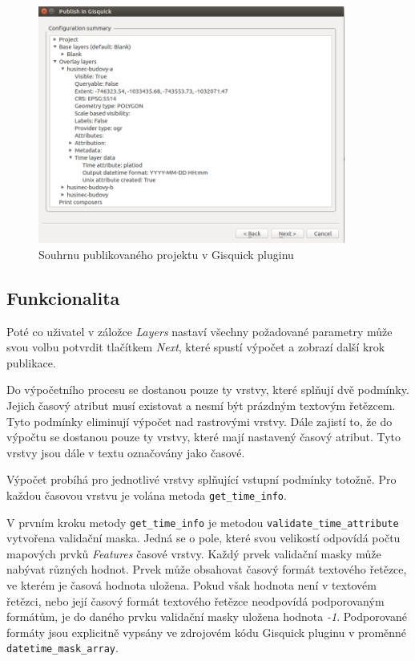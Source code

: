 \begin{figure}[h!]
\centering
\includegraphics[width=0.9\textwidth]{../img/project-publishing-time-summary.png}
\caption{Souhrnu publikovaného projektu v Gisquick pluginu}
\label{fig:publishing-summary}
\end{figure}

\subsection{Funkcionalita}
\label{sssec:plugin-functionality}

Poté co uživatel v záložce \textit{Layers} nastaví všechny požadované
parametry může svou volbu potvrdit tlačítkem \textit{Next}, které
spustí výpočet a zobrazí další krok publikace.

Do výpočetního procesu se dostanou pouze ty vrstvy, které splňují dvě
podmínky. Jejich časový atribut musí existovat a nesmí být prázdným
textovým řetězcem. Tyto podmínky eliminují výpočet nad rastrovými
vrstvy. Dále zajistí to, že do výpočtu se dostanou pouze ty vrstvy,
které mají nastavený časový atribut. Tyto vrstvy jsou dále v textu
označovány jako časové.

Výpočet probíhá pro jednotlivé vrstvy splňující vstupní podmínky
totožně. Pro každou časovou vrstvu je volána metoda \verb|get_time_info|.

V prvním kroku metody \verb|get_time_info| je metodou
\verb|validate_time_attribute| vytvořena validační maska. Jedná se o pole,
které svou velikostí odpovídá počtu mapových prvků \textit{Features}
časové vrstvy. Každý prvek validační masky může nabývat různých
hodnot. Prvek může obsahovat časový formát textového řetězce, ve
kterém je časová hodnota uložena. Pokud však hodnota není v textovém
řetězci, nebo její časový formát textového řetězce neodpovídá
podporovaným formátům, je do daného prvku validační masky uložena
hodnota \textit{-1}. Podporované formáty jsou explicitně vypsány ve
zdrojovém kódu Gisquick pluginu v proměnné \verb|datetime_mask_array|.


